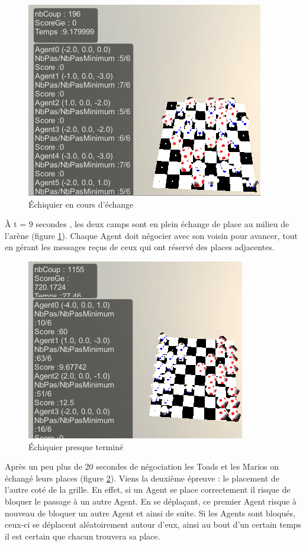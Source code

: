 \documentclass[11pt]{article}
\begin{document}
   \begin{figure}[H]
      \centering
      \includegraphics[scale=0.7]{Image/echequierBattle.png} 
      \caption{\'Echiquier en cours d'échange}
      \label{fig:échiquierBattle}
  \end{figure}
  
   À t = 9 secondes , les deux camps sont en plein échange de place au milieu de l'arène (figure \ref{fig:échiquierBattle}).
  Chaque Agent doit négocier avec son voisin pour avancer, tout en gérant les messages reçus de ceux qui ont réservé des places adjacentes.
  
  
   \begin{figure}[H]
      \centering
      \includegraphics[scale=0.7]{Image/echequierBattlePresqueResolu.png} 
      \caption{\'Echiquier presque terminé}
      \label{fig:échiquierBattlePresqueResolu}
  \end{figure}
  
  
  Après un peu plus de 20 secondes de négociation les Toads et les Marios on échangé leurs places (figure \ref{fig:échiquierBattlePresqueResolu}).
  Viens la deuxième épreuve : le placement de l'autre coté de la grille. En effet, si un Agent se place correctement il risque de bloquer le passage à un autre Agent. 
  En se déplaçant, ce premier Agent risque à nouveau de bloquer un autre Agent et ainsi de suite.
  Si les Agents sont bloqués, ceux-ci se déplacent aléatoirement autour d'eux, ainsi au bout d'un certain temps il est certain que chacun trouvera sa place.
  
\end{document}
